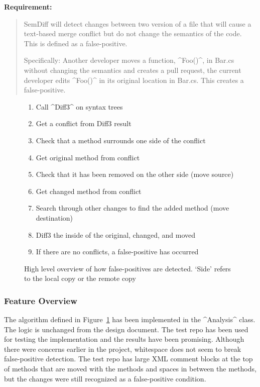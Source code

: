 \documentclass[draftclsnofoot,onecolumn]{IEEEtran}
\begin{document}
\textbf{Requirement:}

\begin{quote}

SemDiff will detect changes between two version of a file that will cause a text-based merge conflict but do not change the semantics of the code. This is defined as a false-positive. 

Specifically: Another developer moves a function, ^Foo()^, in Bar.cs without changing the semantics and creates a pull request, the current developer edits ^Foo()^ in its original location in Bar.cs. This creates a false-positive.

\end{quote}

\begin{figure}[h]
\centering
\begin{enumerate}
    \item Call ^Diff3^ on syntax trees
    \item Get a conflict from Diff3 result
    \item Check that a method surrounds one side of the conflict
    \item Get original method from conflict
    \item Check that it has been removed on the other side (move source)
    \item Get changed method from conflict
    \item Search through other changes to find the added method (move 
destination)
    \item Diff3 the inside of the original, changed, and moved
    \item If there are no conflicts, a false-positive has occurred
\end{enumerate}
\caption{High level overview of how false-positives are detected. `Side' 
refers to the local copy or the remote copy}
\label{fpalgore}
\end{figure}

\subsubsection{Feature Overview}

The algorithm defined in Figure~\ref{fpalgore} has been implemented in the ^Analysis^ class. The logic is unchanged from the design document. The test repo has been used for testing the implementation and the results have been promising. Although there were concerns earlier in the project, whitespace 
does not seem to break false-positive detection. The test repo has large XML comment blocks at the top of methods that are moved with the methods and spaces in between the methods, but the changes were still recognized as a false-positive condition.
\end{document}
